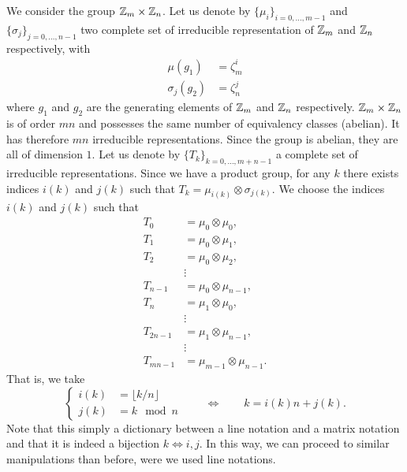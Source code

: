           We consider the group $\mathbb{Z}_m\times\mathbb{Z}_n$. Let us denote by $\{\mu_i\}_{i=0,\dots,m-1}$ and $\{\sigma_j\}_{j=0,\dots,n-1}$ two complete set of irreducible representation of $\mathbb{Z}_m$ and $\mathbb{Z}_n$ respectively, with
           \begin{align}
               \mu(g_1)&=\zeta^i_m\\
               \sigma_j(g_2)&=\zeta^j_n
           \end{align}
           where $g_1$ and $g_2$ are the generating elements of $\mathbb{Z}_m$ and $\mathbb{Z}_n$ respectively. $\mathbb{Z}_m\times\mathbb{Z}_n$ is of order $mn$ and possesses the same number of equivalency classes (abelian). It has therefore $mn$ irreducible representations. Since the group is abelian, they are all of dimension $1$. Let us denote by $\{T_k\}_{k=0,\dots,m+n-1}$ a complete set of irreducible representations. Since we have a product group, for any $k$ there exists indices $i(k)$ and $j(k)$ such that $T_k=\mu_{i(k)}\otimes\sigma_{j(k)}$. We choose the indices $i(k)$ and $j(k)$ such that
           \begin{align*}
               T_0 &= \mu_0\otimes\mu_0,\\
               T_1 &= \mu_0\otimes\mu_1,\\
               T_2 &= \mu_0\otimes\mu_2,\\
               &\vdots\\
               T_{n-1} &= \mu_0\otimes\mu_{n-1},\\
               T_n &= \mu_1\otimes\mu_0,\\
               &\vdots\\
               T_{2n-1} &= \mu_1\otimes\mu_{n-1},\\
               &\vdots\\
               T_{mn-1} &= \mu_{m-1}\otimes\mu_{n-1}.
           \end{align*}
           That is, we take
           \begin{equation}
               \begin{cases}
                   i(k) &= \lfloor k/n\rfloor\\
                   j(k) &= k\mod n
               \end{cases}\qquad \Leftrightarrow \qquad k=i(k)n+j(k).
           \end{equation}
           Note that this simply a dictionary between a line notation and a matrix notation and that it is indeed a bijection $k\Leftrightarrow i,j$. In this way, we can proceed to similar manipulations than before, were we used line notations. 

